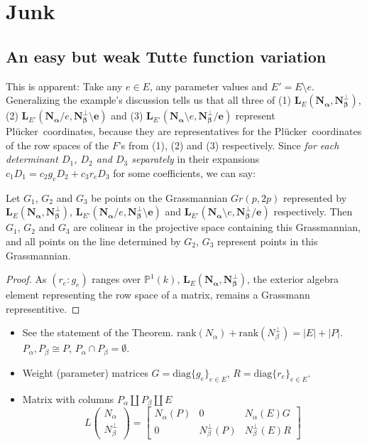 \documentclass[Unicode]{cedram-alco}
\newcommand{\ext}[1]{\ensuremath{\mathbf{#1}}}
\newcommand{\Plucker}{Pl\"{u}cker\ }
\newcommand{\Nal}{\ensuremath{N_{\alpha}}}
\newcommand{\NbePe}{\ensuremath{N_{\beta}^{\perp}}}
\newcommand{\dunion}{\coprod}
\begin{document}
\section{Junk}


\subsection{An easy but weak Tutte function variation}

This is apparent:  Take any $e\in E$, any parameter
values and $E'=E\setminus e$. Generalizing the example's discussion tells us that all three of
(1) $\ext{L}_E(\ext{N_\alpha},\ext{N_\beta^\perp})$,
(2) $\ext{L}_{E'}(\ext{N_\alpha}/e,\ext{N_\beta^\perp\setminus e})$ and
(3) $\ext{L}_{E'}(\ext{N_\alpha}\setminus e,\ext{N_\beta^\perp/e})$ represent
\Plucker coordinates, because they are representatives for the \Plucker coordinates
of the row spaces of the $F$'s from (1), (2) and (3) respectively.  Since \emph{for each determinant
$D_1$, $D_2$ and $D_3$ separately} in their expansions $c_1 D_1 = c_2 g_e D_2 + c_3 r_e D_3$ for
some coefficients, we can say:

\begin{prop}
Let $G_1$, $G_2$ and $G_3$ be points on the Grassmannian $Gr(p,2p)$ represented by
$\ext{L}_E(\ext{N_\alpha},\ext{N_\beta^\perp})$,
$\ext{L}_{E'}(\ext{N_\alpha}/e,\ext{N_\beta^\perp\setminus e})$ and
$\ext{L}_{E'}(\ext{N_\alpha}\setminus e,\ext{N_\beta^\perp/e})$ respectively. Then
$G_1$, $G_2$ and $G_3$ are colinear in the projective space containing this Grassmannian, and
all points on the line determined by $G_2$, $G_3$ represent points in this Grassmannian.
\end{prop}
\begin{proof}
  As $(r_e:g_e)$ ranges over $\mathbb{P}^1(k)$, $\ext{L}_E(\ext{N_\alpha},\ext{N_\beta^\perp})$, the
  exterior algebra element representing the row space of a matrix, remains a Grassmann representitive.
\end{proof}








      \begin{itemize}
  \item
    See the statement of the Theorem.
    $\text{rank}(\Nal)+\text{rank}(\NbePe)=|E|+|P|$.   %
    $P_{\alpha},P_{\beta}\cong P$, $P_{\alpha}\cap P_{\beta}=\emptyset$.
  \item
    Weight (parameter) matrices  %
    $G=\text{diag}\{g_e\}_{e\in E} $,
    $R=\text{diag}\{r_e\}_{e\in E} $.
  \item
    Matrix with columns $P_\alpha \dunion P_\beta \dunion E$
    \[
    L\left( \begin{array}{c} \Nal\\ \NbePe \end{array} \right)
    = \left[\begin{array}{c|c|c} \Nal(P)  &  0  &  \Nal(E)G \\  \hline
0  & \NbePe(P)  &  \NbePe(E)R \end{array}\right]
    \]
  \end{itemize}
\end{document}
